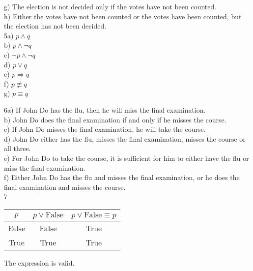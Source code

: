 \documentclass{article}
\begin{document}
g) The election is not decided only if the votes have not been counted. \\

h) Either the votes have not been counted or the votes have been counted, but the election has not been decided. \\

\vspace{10mm}
5a) \( p \land q \) \\

b) \( p \land \neg q \) \\

c) \( \neg p \land \neg q \) \\

d) \( p \vee q \) \\

e) \( p \Longrightarrow q \) \\

f) \( p \not\equiv q \) \\

g) \( p \equiv q \) \\

\newpage

6a) If John Do has the flu, then he will miss the final examination. \\

b) John Do does the final examination if and only if he misses the course. \\

c) If John Do misses the final examination, he will take the course. \\

d) John Do either has the flu, misses the final examination, misses the course or all three. \\

e) For John Do to take the course, it is sufficient for him to either have the flu or miss the final examination. \\

f) Either John Do has the flu and misses the final examination, or he does the final examination and misses the course. \\

\vspace{10mm}
7
\begin{center}
    \begin{tabular}{c|c||c}
        $p$ & \( p \vee \textrm{False} \) & \( p \vee \textrm{False} \equiv p \) \\
        \hline
        False & False & True \\
        True & True & True \\
    \end{tabular}
    The expression is valid.
\end{center}
\end{document}
